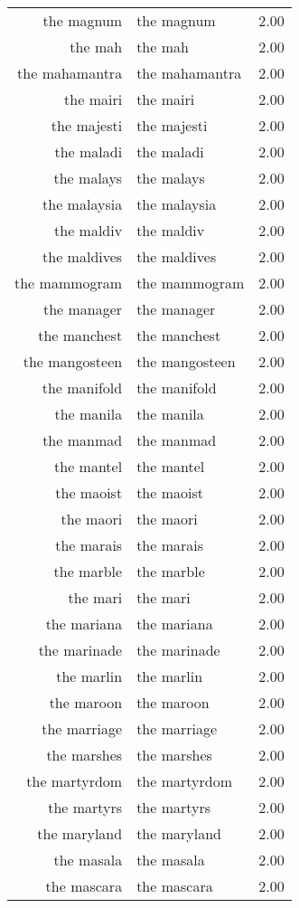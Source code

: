 \begin{table}[ht]
\begin{tabular}{rlr}
  the magnum & the magnum & 2.00 \\ 
  the mah & the mah & 2.00 \\ 
  the mahamantra & the mahamantra & 2.00 \\ 
  the mairi & the mairi & 2.00 \\ 
  the majesti & the majesti & 2.00 \\ 
  the maladi & the maladi & 2.00 \\ 
  the malays & the malays & 2.00 \\ 
  the malaysia & the malaysia & 2.00 \\ 
  the maldiv & the maldiv & 2.00 \\ 
  the maldives & the maldives & 2.00 \\ 
  the mammogram & the mammogram & 2.00 \\ 
  the manager & the manager & 2.00 \\ 
  the manchest & the manchest & 2.00 \\ 
  the mangosteen & the mangosteen & 2.00 \\ 
  the manifold & the manifold & 2.00 \\ 
  the manila & the manila & 2.00 \\ 
  the manmad & the manmad & 2.00 \\ 
  the mantel & the mantel & 2.00 \\ 
  the maoist & the maoist & 2.00 \\ 
  the maori & the maori & 2.00 \\ 
  the marais & the marais & 2.00 \\ 
  the marble & the marble & 2.00 \\ 
  the mari & the mari & 2.00 \\ 
  the mariana & the mariana & 2.00 \\ 
  the marinade & the marinade & 2.00 \\ 
  the marlin & the marlin & 2.00 \\ 
  the maroon & the maroon & 2.00 \\ 
  the marriage & the marriage & 2.00 \\ 
  the marshes & the marshes & 2.00 \\ 
  the martyrdom & the martyrdom & 2.00 \\ 
  the martyrs & the martyrs & 2.00 \\ 
  the maryland & the maryland & 2.00 \\ 
  the masala & the masala & 2.00 \\ 
  the mascara & the mascara & 2.00 \\ 

\end{tabular}
\end{table}
